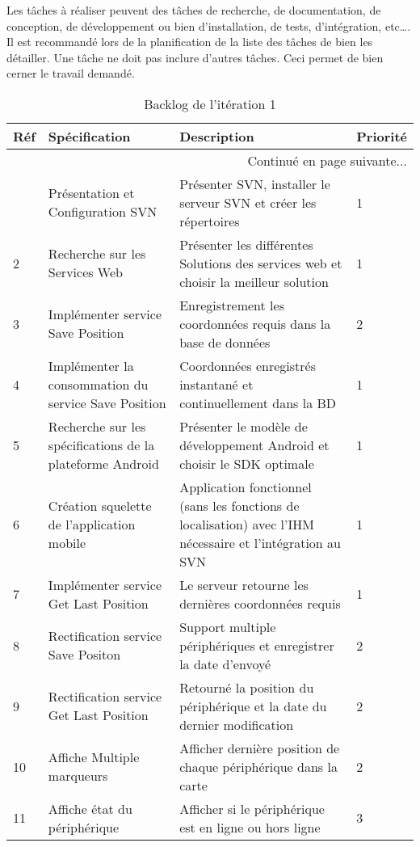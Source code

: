 Les tâches à réaliser peuvent  des tâches de
recherche, de documentation, de conception, de développement ou bien
d'installation, de tests, d'intégration, etc\ldots. Il est recommandé lors de
la planification de la liste des tâches de bien les détailler. Une tâche ne
doit pas inclure d'autres tâches. Ceci permet de bien cerner le travail
demandé.
\begin{center}
    \footnotesize
    \begin{longtable}{| p{1cm} | p{5cm} | p{7cm} | p{1cm} |}
        \caption{Backlog de l'itération 1}
        \label{tab:sprint1-backlog} \\

 \hline
 \textbf{Réf} & \textbf{Spécification} & \textbf{Description} & \textbf{Priorité} \\ \hline
 \endhead

 \hline \multicolumn{4}{|r|}{{Continué en page suivante$\dotsc$}} \\ \hline
 \endfoot

 \hline \hline
 \endlastfoot

\hline
1 & Présentation et Configuration SVN & Présenter SVN, installer le serveur SVN et créer les répertoires  & 1 \\ \hline
2 & Recherche sur les Services Web & Présenter les différentes Solutions des services web et choisir la meilleur solution & 1 \\ \hline
3 & Implémenter service Save Position & Enregistrement les coordonnées requis dans la base de données & 2 \\ \hline
4 & Implémenter la consommation du service Save Position & Coordonnées enregistrés instantané et continuellement dans la BD & 1 \\ \hline
5 & Recherche sur les spécifications de la plateforme Android & Présenter le modèle de développement Android et choisir le SDK optimale & 1 \\ \hline
6 & Création squelette de l'application mobile & Application fonctionnel (sans les fonctions de localisation) avec l'IHM nécessaire et l'intégration au SVN & 1 \\ \hline
7 & Implémenter service Get Last Position & Le serveur retourne les dernières coordonnées requis & 1 \\ \hline
8 & Rectification service Save Positon & Support multiple périphériques et enregistrer la date d'envoyé & 2 \\ \hline
9 & Rectification service Get Last Position & Retourné la position du périphérique et la date du dernier modification & 2 \\ \hline
10 & Affiche Multiple marqueurs & Afficher dernière position de chaque périphérique dans la carte & 2 \\ \hline
11 & Affiche état du périphérique & Afficher si le périphérique est en ligne ou hors ligne & 3 \\ \hline
\end{longtable}
\end{center}

